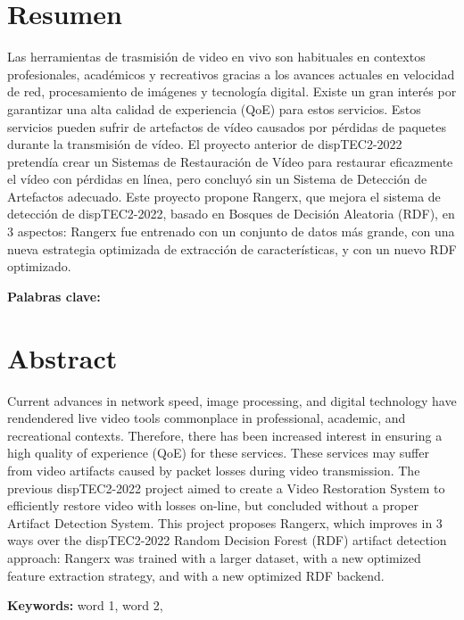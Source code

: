 \chapter*{Resumen}
\thispagestyle{empty}

Las herramientas de trasmisión de video en vivo son habituales en contextos profesionales, académicos y recreativos gracias a los avances actuales en velocidad de red, procesamiento de imágenes y tecnología digital. Existe un gran interés por garantizar una alta calidad de experiencia (QoE) para estos servicios. Estos servicios pueden sufrir de artefactos de vídeo causados por pérdidas de paquetes durante la transmisión de vídeo. El proyecto anterior de dispTEC2-2022 pretendía crear un Sistemas de Restauración de Vídeo para restaurar eficazmente el vídeo con pérdidas en línea, pero concluyó sin un Sistema de Detección de Artefactos adecuado. Este proyecto propone Rangerx, que mejora el sistema de detección de dispTEC2-2022, basado en Bosques de Decisión Aleatoria (RDF), en 3 aspectos: Rangerx fue entrenado con un conjunto de datos más grande, con una nueva estrategia optimizada de extracción de características, y con un nuevo RDF optimizado.
\bigskip

\textbf{Palabras clave:} \thesisKeywords

\clearpage
\chapter*{Abstract}
\thispagestyle{empty}

Current advances in network speed, image processing, and digital technology have rendendered live video tools commonplace in professional, academic, and recreational contexts. Therefore, there has been increased interest in ensuring a high quality of experience (QoE) for these services. These services may suffer from video artifacts caused by packet losses during video transmission. The previous dispTEC2-2022 project aimed to create a Video Restoration System to efficiently restore video with losses on-line, but concluded without a proper Artifact Detection System. This project proposes Rangerx, which improves in 3 ways over the dispTEC2-2022 Random Decision Forest (RDF) artifact detection approach: Rangerx was trained with a larger dataset, with a new optimized feature extraction strategy, and with a new optimized RDF backend.

\bigskip

\textbf{Keywords:} word 1, word 2, 

\cleardoublepage

